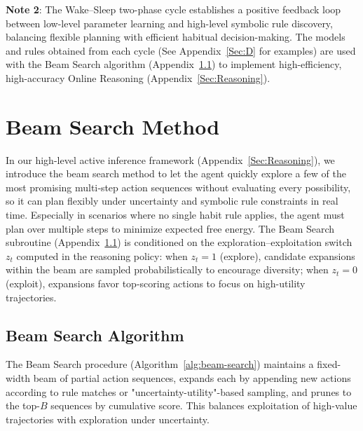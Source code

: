\documentclass{article} %
\begin{document}
\noindent\textbf{Note 2}: The Wake–Sleep two-phase cycle establishes a positive feedback loop between low-level parameter learning and high-level symbolic rule discovery, balancing flexible planning with efficient habitual decision-making. The models and rules obtained from each cycle (See Appendix~\ref{Sec:D} for examples) are used with the Beam Search algorithm (Appendix~\ref{Sec:Beam search}) to implement high-efficiency, high-accuracy Online Reasoning (Appendix~\ref{Sec:Reasoning}).


\section{Beam Search Method}
\label{Sec:B}
In our high-level active inference framework (Appendix~\ref{Sec:Reasoning}), we introduce the beam search method to let the agent quickly explore a few of the most promising multi‐step action sequences without evaluating every possibility, so it can plan flexibly under uncertainty and symbolic rule constraints in real time. Especially in scenarios where no single habit rule applies, the agent must plan over multiple steps to minimize expected free energy. The Beam Search subroutine (Appendix~\ref{Sec:Beam search}) is conditioned on the exploration–exploitation switch $z_t$ computed in the reasoning policy: when $z_t=1$ (explore), candidate expansions within the beam are sampled probabilistically to encourage diversity; when $z_t=0$ (exploit), expansions favor top-scoring actions to focus on high-utility trajectories.


\subsection{Beam Search Algorithm}
\label{Sec:Beam search}
The Beam Search procedure (Algorithm~\ref{alg:beam-search}) maintains a fixed-width beam of partial action sequences, expands each by appending new actions according to rule matches or "uncertainty-utility"-based sampling, and prunes to the top-$B$ sequences by cumulative score. This balances exploitation of high-value trajectories with exploration under uncertainty.
\end{document}
